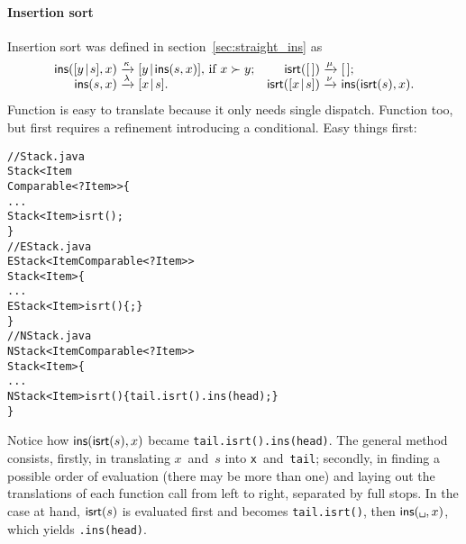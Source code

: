 \paragraph{Insertion sort}

Insertion sort was defined in section~\vref{sec:straight_ins} as
\begin{equation*}
\begin{array}{@{}r@{\;}l@{\;}lr@{\;}l@{\;}l@{}}
  \fun{ins}(\cons{y}{s},x)
& \xrightarrow{\smash{\kappa}}
& \cons{y}{\fun{ins}(s,x)}, \,\text{if \(x \succ y\)};
& \fun{isrt}(\el)
& \xrightarrow{\smash{\mu}}
& \el;\\
  \fun{ins}(s,x)
& \xrightarrow{\smash{\lambda}}
& \cons{x}{s}.
& \fun{isrt}(\cons{x}{s})
& \xrightarrow{\smash{\nu}}
& \fun{ins}(\fun{isrt}(s),x).
\end{array}
\end{equation*}
Function  is easy to translate because it only needs
single dispatch. Function  too, but first requires a refinement
introducing a conditional. Easy things first:
\begin{alltt}
// Stack.java
\public \abstractX \class Stack<Item
\hfill\extends Comparable<? \super Item>> \{
  ...
  \public \abstractX Stack<Item> isrt();
\}
// EStack.java
\public \class EStack<Item \extends Comparable<? \super Item>>
       \extends Stack<Item> \{
  ...
  \public EStack<Item> isrt() \{ \return \this; \}
\}
// NStack.java
\public \class NStack<Item \extends Comparable<? \super Item>>
       \extends Stack<Item> \{
  ...
  \public NStack<Item> isrt() \{\return tail.isrt().ins(head);\}
\}
\end{alltt}
Notice how \(\textsf{ins}(\textsf{isrt}(s),x)\) became
\texttt{tail.isrt().ins(head)}. The general method consists, firstly,
in translating \(x\)~and~\(s\) into \texttt{x}~and~\texttt{tail};
secondly, in finding a possible order of evaluation (there may be more
than one) and laying out the translations of each function call from
left to right, separated by full stops. In the case at hand,
\(\textsf{isrt}(s)\) is evaluated first and becomes \texttt{tail.isrt()},
then \(\fun{ins}(\texttt{\textvisiblespace},x)\), which yields
\texttt{\textvisiblespace.ins(head)}.

